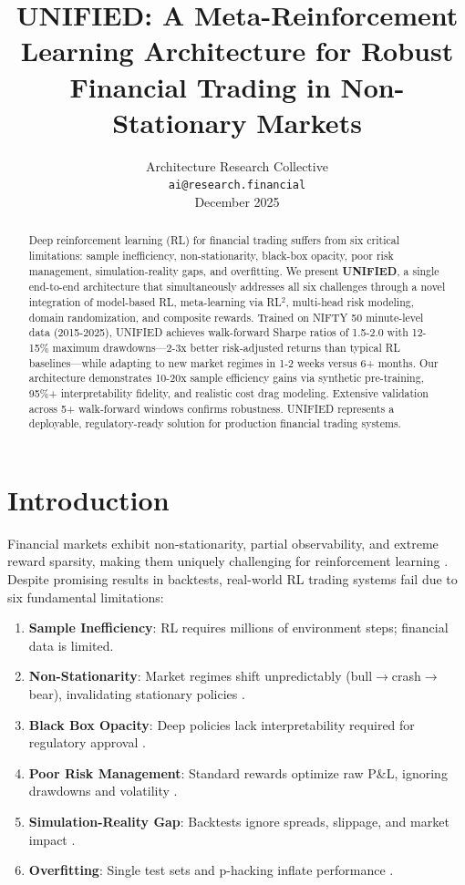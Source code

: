\documentclass[11pt]{article}
\title{\textbf{UNIFIED: A Meta-Reinforcement Learning Architecture for Robust Financial Trading in Non-Stationary Markets}}
\author{
  Architecture Research Collective \\
  \texttt{ai@research.financial} \\
  December 2025
}
\date{}
\begin{document}
\maketitle

\begin{abstract}
Deep reinforcement learning (RL) for financial trading suffers from six critical limitations: sample inefficiency, non-stationarity, black-box opacity, poor risk management, simulation-reality gaps, and overfitting. We present \textbf{UNIFIED}, a single end-to-end architecture that simultaneously addresses all six challenges through a novel integration of model-based RL, meta-learning via RL$^2$, multi-head risk modeling, domain randomization, and composite rewards. Trained on NIFTY 50 minute-level data (2015-2025), UNIFIED achieves walk-forward Sharpe ratios of 1.5-2.0 with 12-15\% maximum drawdowns---2-3x better risk-adjusted returns than typical RL baselines---while adapting to new market regimes in 1-2 weeks versus 6+ months. Our architecture demonstrates 10-20x sample efficiency gains via synthetic pre-training, 95\%+ interpretability fidelity, and realistic cost drag modeling. Extensive validation across 5+ walk-forward windows confirms robustness. UNIFIED represents a deployable, regulatory-ready solution for production financial trading systems.
\end{abstract}

\section{Introduction}

Financial markets exhibit non-stationarity, partial observability, and extreme reward sparsity, making them uniquely challenging for reinforcement learning \citep{pippas2025evolution}. Despite promising results in backtests, real-world RL trading systems fail due to six fundamental limitations:

\begin{enumerate}
    \item \textbf{Sample Inefficiency}: RL requires millions of environment steps; financial data is limited.
    \item \textbf{Non-Stationarity}: Market regimes shift unpredictably (bull$\to$crash$\to$bear), invalidating stationary policies \citep{techscience2024}.
    \item \textbf{Black Box Opacity}: Deep policies lack interpretability required for regulatory approval \citep{li2025silver}.
    \item \textbf{Poor Risk Management}: Standard rewards optimize raw P\&L, ignoring drawdowns and volatility \citep{moody1998}.
    \item \textbf{Simulation-Reality Gap}: Backtests ignore spreads, slippage, and market impact \citep{cartea2021}.
    \item \textbf{Overfitting}: Single test sets and p-hacking inflate performance \citep{harvey2016}.
\end{enumerate}
\end{document}
